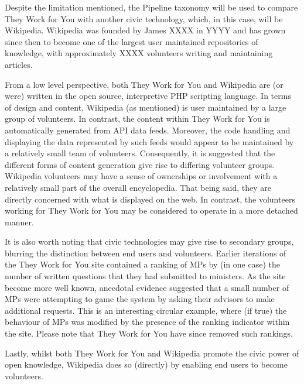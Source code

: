Despite the limitation mentioned, the Pipeline taxonomy will be used to compare They Work for You with another civic technology, which, in this case, will be Wikipedia. Wikipedia was founded by James XXXX in YYYY and has grown since then to become one of the largest user maintained repositories of knowledge, with approximately XXXX volunteers writing and maintaining articles.

From a low level perspective, both They Work for You and Wikipedia are (or were) written in the open source, interpretive PHP scripting language. In terms of design and content, Wikipedia (as mentioned) is user maintained by a large group of volunteers. In contrast, the content within They Work for You is automatically generated from API data feeds. Moreover, the code handling and displaying the data represented by such feeds would appear to be maintained by a relatively small team of volunteers. Consequently, it is suggested that the different forms of content generation give rise to differing volunteer groups. Wikipedia volunteers may have a sense of ownerships or involvement with a relatively small part of the overall encyclopedia.  That being said, they are directly concerned with what is displayed on the web. In contrast, the volunteers working for They Work for You may be considered to operate in a more detached manner.

It is also worth noting that civic technologies may give rise to secondary groups, blurring the distinction between end users and volunteers. Earlier iterations of the They Work for You site contained a ranking of MPs by (in one case) the number of written questions that they had submitted to ministers. As the site become more well known, anecdotal evidence suggested that a small number of MPs were attempting to game the system by asking their advisors to make additional requests. This is an interesting circular example, where (if true) the behaviour of MPs was modified by the presence of the ranking indicator within the site. Please note that They Work for You have since removed such rankings.

Lastly, whilst both They Work for You and Wikipedia promote the civic power of open knowledge, Wikipedia does so (directly) by enabling end users to become volunteers. 